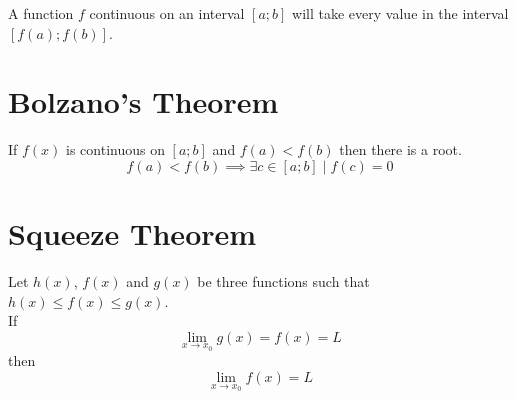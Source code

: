 \documentclass{article}
\begin{document}
A function \(f\) continuous on an interval \([a;b]\) will take
every value in the interval \([f(a);f(b)]\).

\pagebreak

\section{Bolzano's Theorem}

If \(f(x)\) is continuous on \([a;b]\) and \(f(a)<f(b)\) then there is a root.
\[
    f(a)<f(b) \implies \exists c \in [a;b] \mid f(c) = 0
\]

\section{Squeeze Theorem}

Let \(h(x)\), \(f(x)\) and \(g(x)\) be three functions such that
\(h(x) \leq f(x) \leq g(x)\). \\
If
\[
    \lim_{x \to x_0} g(x) = f(x) = L
\]
then
\[
    \lim_{x \to x_0} f(x) = L
\]

\end{document}

